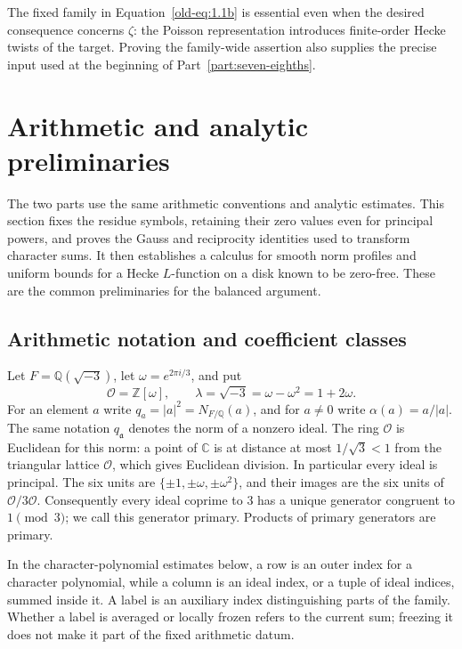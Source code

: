 \documentclass[11pt,a4paper]{article}
\numberwithin{equation}{section}
\numberwithin{figure}{section}
\theoremstyle{definition}
\theoremstyle{remark}
\begin{document}
The fixed family in Equation~\eqref{old-eq:1.1b} is essential even when the
desired consequence concerns $\zeta$: the Poisson representation introduces
finite-order Hecke twists of the target. Proving the family-wide assertion
also supplies the precise input used at the beginning of
Part~\ref{part:seven-eighths}.

\section{Arithmetic and analytic preliminaries}\label{sec:arithmetic}

The two parts use the same arithmetic conventions and analytic estimates.
This section fixes the residue symbols, retaining their zero values even for
principal powers, and proves the Gauss and reciprocity identities used to
transform character sums.  It then establishes a calculus for smooth norm
profiles and uniform bounds for a Hecke $L$-function on a disk known to be
zero-free.  These are the common preliminaries for the balanced argument.

\subsection{Arithmetic notation and coefficient classes}

Let $F=\mathbb Q(\sqrt{-3})$, let
$\omega=e^{2\pi i/3}$, and put
\[
 \mathcal O=\mathbb Z[\omega],\qquad
 \lambda=\sqrt{-3}=\omega-\omega^2=1+2\omega.
\]
For an element $a$ write $q_a=|a|^2=N_{F/\mathbb Q}(a)$, and for $a\ne0$
write $\alpha(a)=a/|a|$.  The same notation $q_{\mathfrak a}$ denotes the norm of
a nonzero ideal.  The ring $\mathcal O$ is Euclidean for this norm: a point of
$\mathbb C$ is at distance at most $1/\sqrt3<1$ from the triangular lattice
$\mathcal O$, which gives Euclidean division.  In particular every ideal is
principal.  The six units are $\{\pm1,\pm\omega,\pm\omega^2\}$, and their
images are the six units of $\mathcal O/3\mathcal O$.  Consequently every
ideal coprime to $3$ has a unique generator congruent to $1\pmod3$; we call
this generator primary.  Products of primary generators are primary.

In the character-polynomial estimates below, a row is an outer index for a
character polynomial, while a column is an ideal index, or a tuple of ideal indices,
summed inside it.  A label is an auxiliary index distinguishing parts of the
family.  Whether a label is averaged or locally frozen refers to the current
sum; freezing it does not make it part of the fixed arithmetic datum.
\end{document}
